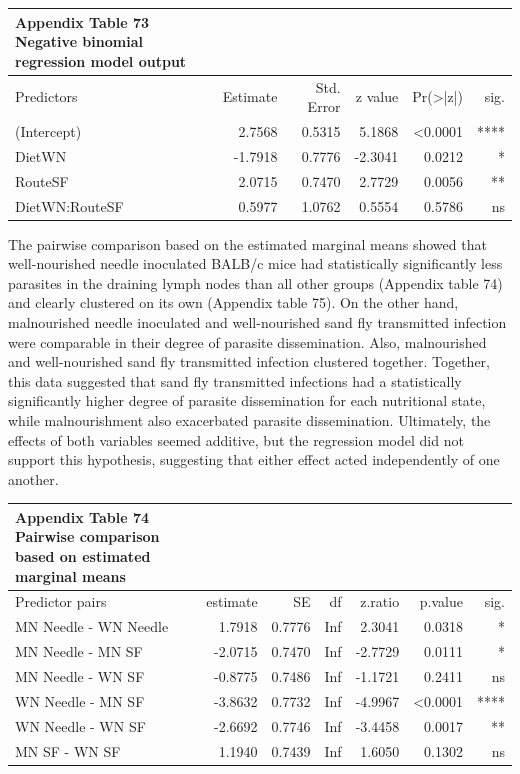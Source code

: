 \documentclass[
  12pt,
  letterpaper,
]{article}
\begin{document}
\begingroup
\fontsize{12.0pt}{14.4pt}\selectfont
\begin{longtable}{l|rrrrr}
\caption*{
{\large \textbf{Appendix Table 73}} \\ 
{\small \textbf{Negative binomial regression model output}}
} \\ 
\toprule
Predictors & {Estimate} & {Std. Error} & {z value} & {Pr(>|z|)} & {sig.} \\ 
\midrule\addlinespace[2.5pt]
(Intercept) & 2.7568 & 0.5315 & 5.1868 & <0.0001 & **** \\ 
DietWN & -1.7918 & 0.7776 & -2.3041 & 0.0212 & * \\ 
RouteSF & 2.0715 & 0.7470 & 2.7729 & 0.0056 & ** \\ 
DietWN:RouteSF & 0.5977 & 1.0762 & 0.5554 & 0.5786 & ns \\ 
\bottomrule
\end{longtable}
\endgroup

The pairwise comparison based on the estimated marginal means showed that well-nourished needle inoculated BALB/c mice had statistically significantly less parasites in the draining lymph nodes than all other groups (Appendix table 74) and clearly clustered on its own (Appendix table 75). On the other hand, malnourished needle inoculated and well-nourished sand fly transmitted infection were comparable in their degree of parasite dissemination. Also, malnourished and well-nourished sand fly transmitted infection clustered together. Together, this data suggested that sand fly transmitted infections had a statistically significantly higher degree of parasite dissemination for each nutritional state, while malnourishment also exacerbated parasite dissemination. Ultimately, the effects of both variables seemed additive, but the regression model did not support this hypothesis, suggesting that either effect acted independently of one another.

\begingroup
\fontsize{12.0pt}{14.4pt}\selectfont
\begin{longtable}{l|rrrrrr}
\caption*{
{\large \textbf{Appendix Table 74}} \\ 
{\small \textbf{Pairwise comparison based on estimated marginal means}}
} \\ 
\toprule
Predictor pairs & {estimate} & {SE} & {df} & {z.ratio} & {p.value} & {sig.} \\ 
\midrule\addlinespace[2.5pt]
MN Needle - WN Needle & 1.7918 & 0.7776 & Inf & 2.3041 & 0.0318 & * \\ 
MN Needle - MN SF & -2.0715 & 0.7470 & Inf & -2.7729 & 0.0111 & * \\ 
MN Needle - WN SF & -0.8775 & 0.7486 & Inf & -1.1721 & 0.2411 & ns \\ 
WN Needle - MN SF & -3.8632 & 0.7732 & Inf & -4.9967 & <0.0001 & **** \\ 
WN Needle - WN SF & -2.6692 & 0.7746 & Inf & -3.4458 & 0.0017 & ** \\ 
MN SF - WN SF & 1.1940 & 0.7439 & Inf & 1.6050 & 0.1302 & ns \\ 
\bottomrule
\end{longtable}
\endgroup
\end{document}

